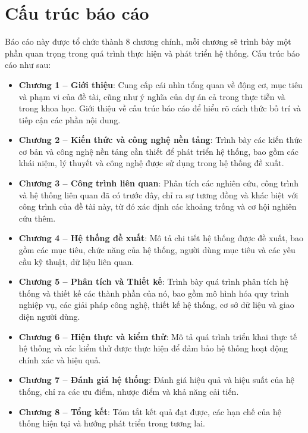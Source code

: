 \section{Cấu trúc báo cáo}

Báo cáo này được tổ chức thành 8 chương chính, mỗi chương sẽ trình bày một phần quan trọng trong quá trình thực hiện và phát triển hệ thống. Cấu trúc báo cáo như sau:

\begin{itemize}
    \item \textbf{Chương 1 – Giới thiệu}: Cung cấp cái nhìn tổng quan về động cơ, mục tiêu và phạm vi của đề tài, cũng như ý nghĩa của dự án cả trong thực tiễn và trong khoa học. Giới thiệu về cấu trúc báo cáo để hiểu rõ cách thức bố trí và tiếp cận các phần nội dung.
    
    \item \textbf{Chương 2 – Kiến thức và công nghệ nền tảng}: Trình bày các kiến thức cơ bản và công nghệ nền tảng cần thiết để phát triển hệ thống, bao gồm các khái niệm, lý thuyết và công nghệ được sử dụng trong hệ thống đề xuất.
    
    \item \textbf{Chương 3 – Công trình liên quan}: Phân tích các nghiên cứu, công trình và hệ thống liên quan đã có trước đây, chỉ ra sự tương đồng và khác biệt với công trình của đề tài này, từ đó xác định các khoảng trống và cơ hội nghiên cứu thêm.
    
    \item \textbf{Chương 4 – Hệ thống đề xuất}: Mô tả chi tiết hệ thống được đề xuất, bao gồm các mục tiêu, chức năng của hệ thống, người dùng mục tiêu và các yêu cầu kỹ thuật, dữ liệu liên quan.
    
    \item \textbf{Chương 5 – Phân tích và Thiết kế}: Trình bày quá trình phân tích hệ thống và thiết kế các thành phần của nó, bao gồm mô hình hóa quy trình nghiệp vụ, các giải pháp công nghệ, thiết kế hệ thống, cơ sở dữ liệu và giao diện người dùng.
    
    \item \textbf{Chương 6 – Hiện thực và kiểm thử}: Mô tả quá trình triển khai thực tế hệ thống và các kiểm thử được thực hiện để đảm bảo hệ thống hoạt động chính xác và hiệu quả.
    
    \item \textbf{Chương 7 – Đánh giá hệ thống}: Đánh giá hiệu quả và hiệu suất của hệ thống, chỉ ra các ưu điểm, nhược điểm và khả năng cải tiến.
    
    \item \textbf{Chương 8 – Tổng kết}: Tóm tắt kết quả đạt được, các hạn chế của hệ thống hiện tại và hướng phát triển trong tương lai.
\end{itemize}

